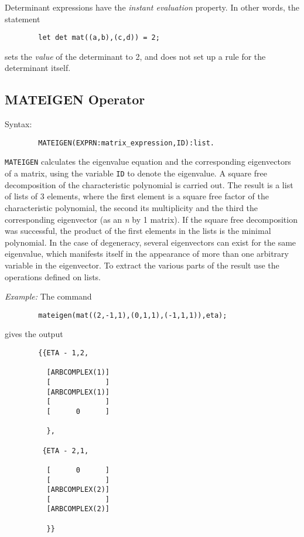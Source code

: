 Determinant expressions have the {\em instant evaluation\/} property.
  In other words, the statement
\begin{verbatim}
        let det mat((a,b),(c,d)) = 2;
\end{verbatim}
sets the {\em value\/} of the determinant to 2, and does not set up a rule
for the determinant itself.

\subsection{MATEIGEN Operator}
\hypertarget{operator:MATEIGEN}{}
Syntax:
\begin{verbatim}
        MATEIGEN(EXPRN:matrix_expression,ID):list.
\end{verbatim}

{\tt MATEIGEN} calculates the eigenvalue equation and the corresponding
eigenvectors of a matrix, using the variable {\tt ID} to denote the
eigenvalue.  A square free decomposition of the characteristic polynomial
is carried out.  The result is a list of lists of 3 elements, where the
first element is a square free factor of the characteristic polynomial,
the second its multiplicity and the third the corresponding eigenvector
(as an {\em n} by 1 matrix).  If the square free decomposition was
successful, the product of the first elements in the lists is the minimal
polynomial.  In the case of degeneracy, several eigenvectors can exist for
the same eigenvalue, which manifests itself in the appearance of more than
one arbitrary variable in the eigenvector.  To extract the various parts
of the result use the operations defined on lists.

{\it Example:}
 The command
\begin{verbatim}
        mateigen(mat((2,-1,1),(0,1,1),(-1,1,1)),eta);
\end{verbatim}
gives the output
\begin{verbatim}
        {{ETA - 1,2,

          [ARBCOMPLEX(1)]
          [             ]
          [ARBCOMPLEX(1)]
          [             ]
          [      0      ]

          },

         {ETA - 2,1,

          [      0      ]
          [             ]
          [ARBCOMPLEX(2)]
          [             ]
          [ARBCOMPLEX(2)]

          }}
\end{verbatim}

